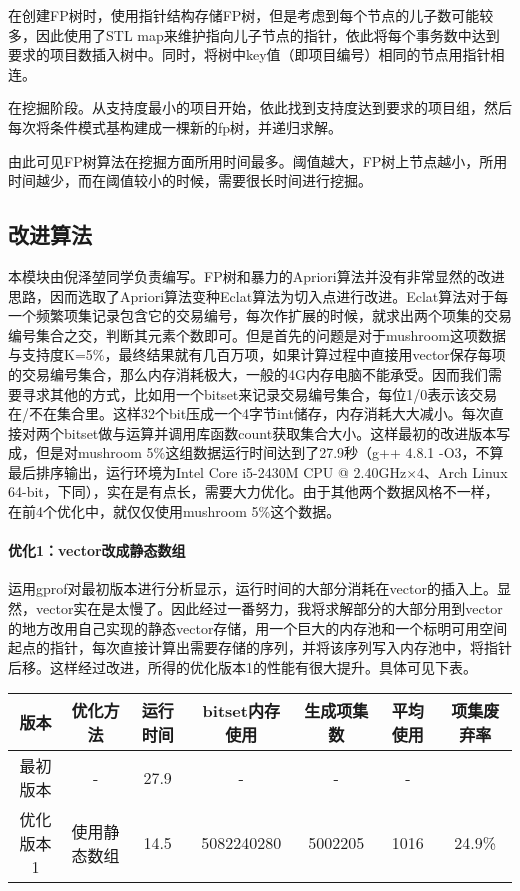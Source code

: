 \documentclass[a4paper,9pt]{article}
\begin{document}
在创建FP树时，使用指针结构存储FP树，但是考虑到每个节点的儿子数可能较多，因此使用了STL map来维护指向儿子节点的指针，依此将每个事务数中达到要求的项目数插入树中。同时，将树中key值（即项目编号）相同的节点用指针相连。

在挖掘阶段。从支持度最小的项目开始，依此找到支持度达到要求的项目组，然后每次将条件模式基构建成一棵新的fp树，并递归求解。

由此可见FP树算法在挖掘方面所用时间最多。阈值越大，FP树上节点越小，所用时间越少，而在阈值较小的时候，需要很长时间进行挖掘。
\subsection{改进算法}
本模块由倪泽堃同学负责编写。FP树和暴力的Apriori算法并没有非常显然的改进思路，因而选取了Apriori算法变种Eclat算法为切入点进行改进。Eclat算法对于每一个频繁项集记录包含它的交易编号，每次作扩展的时候，就求出两个项集的交易编号集合之交，判断其元素个数即可。但是首先的问题是对于mushroom这项数据与支持度K=5\%，最终结果就有几百万项，如果计算过程中直接用vector保存每项的交易编号集合，那么内存消耗极大，一般的4G内存电脑不能承受。因而我们需要寻求其他的方式，比如用一个bitset来记录交易编号集合，每位1/0表示该交易在/不在集合里。这样32个bit压成一个4字节int储存，内存消耗大大减小。每次直接对两个bitset做与运算并调用库函数count获取集合大小。这样最初的改进版本写成，但是对mushroom 5\%这组数据运行时间达到了27.9秒（g++ 4.8.1 -O3，不算最后排序输出，运行环境为Intel Core i5-2430M CPU @ 2.40GHz$\times$4、Arch Linux 64-bit，下同），实在是有点长，需要大力优化。由于其他两个数据风格不一样，在前4个优化中，就仅仅使用mushroom 5\%这个数据。

\paragraph{优化1：vector改成静态数组}
运用gprof对最初版本进行分析显示，运行时间的大部分消耗在vector的插入上。显然，vector实在是太慢了。因此经过一番努力，我将求解部分的大部分用到vector的地方改用自己实现的静态vector存储，用一个巨大的内存池和一个标明可用空间起点的指针，每次直接计算出需要存储的序列，并将该序列写入内存池中，将指针后移。这样经过改进，所得的优化版本1的性能有很大提升。具体可见下表。
\begin{center}
	\begin{tabular}{ccccccc}
		版本&优化方法&运行时间&bitset内存使用&生成项集数&平均使用&项集废弃率\\\hline
		最初版本&-&27.9&-&-&-\\
		优化版本1&使用静态数组&14.5&5082240280&5002205&1016&24.9\%
	\end{tabular}
\end{center}
\end{document}
